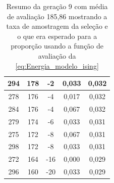 \begin{table}[h!]
\begin{tabular}{|c|c|c|c|c|}
		294	&  178	&  -2 	&  0,033	&  0,032 \\ \hline 
		278	&  176	&  -4 	&  0,017	&  0,032 \\ \hline 
		284	&  176	&  -4 	&  0,067	&  0,032 \\ \hline 
		279	&  174	&  -6 	&  0,033	&  0,031 \\ \hline 
		275	&  172	&  -8 	&  0,067	&  0,031 \\ \hline 
		298	&  172	&  -8 	&  0,033	&  0,031 \\ \hline 
		272	&  164	&  -16 	&  0,000	&  0,029 \\ \hline 
		296	&  160	&  -20 	&  0,033	&  0,029 \\
		\hline
	\end{tabular}
	\caption{Resumo da geração 9 com média de avaliação 185,86 mostrando a taxa de amostragem da seleção e o que era esperado para a proporção usando a função de avaliação da \autoref{eq:Energia_modelo_ising}}
	\label{tab:resumo_GA_H}
\end{table}
\clearpage

